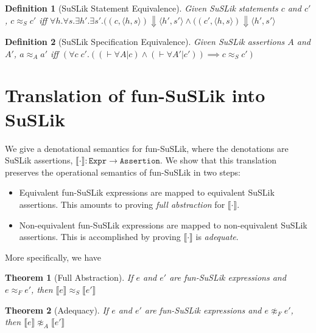 \documentclass[10pt]{article}
\newtheorem{theorem}{Theorem}
\newtheorem{definition}{Definition}
\newcommand{\ttt}[1]{\texttt{#1}}
\newcommand{\ra}{\ensuremath{\rightarrow}}
\newcommand{\BigStep}{\ensuremath{\Downarrow}}
\newcommand{\sem} [1] {\llbracket#1\rrbracket}
\begin{document}
\noindent
\begin{definition}[SuSLik Statement Equivalence]
  Given SuSLik statements $c$ and $c'$, $c \approx_S c'$ iff
    $\forall h. \forall s. \exists h'. \exists s'.
      ((c, \langle h, s \rangle) \BigStep \langle h' , s' \rangle
      \land
      ((c', \langle h, s \rangle) \BigStep \langle h' , s' \rangle$
\end{definition}

\begin{definition}[SuSLik Specification Equivalence]
  Given SuSLik assertions $A$ and $A'$, $a \approx_A a'$ iff
    $(\forall c\; c'. ((\vdash \forall A | c) \land (\vdash \forall A' | c')) \implies c \approx_S c')$
\end{definition}

\section{Translation of fun-SuSLik into SuSLik}

We give a denotational semantics for fun-SuSLik, where the denotations are SuSLik assertions, $\sem{\cdot} : \ttt{Expr} \ra \ttt{Assertion}$.
We show that this translation preserves the operational semantics of fun-SuSLik in two steps:

\begin{itemize}
  \item Equivalent fun-SuSLik expressions are mapped to equivalent SuSLik assertions. This amounts to proving
    \textit{full abstraction} for $\sem{\cdot}$.
  \item Non-equivalent fun-SuSLik expressions are mapped to non-equivalent SuSLik assertions.
    This is accomplished by proving $\sem{\cdot}$ is \textit{adequate}.
\end{itemize}

\noindent
More specifically, we have

\begin{theorem}[Full Abstraction]
  If $e$ and $e'$ are fun-SuSLik expressions and $e \approx_F e'$, then $\sem{e} \approx_S \sem{e'}$
\end{theorem}

\begin{theorem}[Adequacy]
  If $e$ and $e'$ are fun-SuSLik expressions and $e \not\approx_F e'$, then $\sem{e} \not\approx_A \sem{e'}$
\end{theorem}
\end{document}
